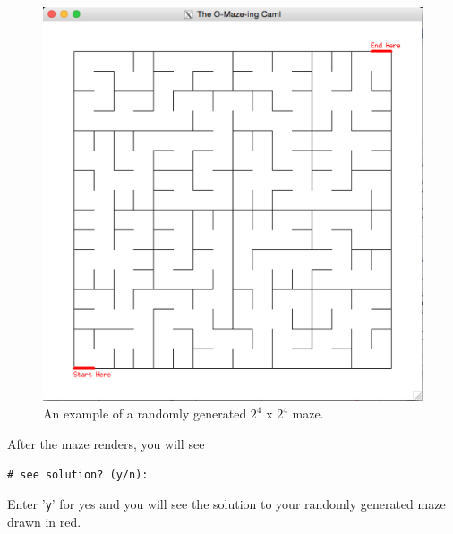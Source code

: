 \documentclass[11pt, margin=1in]{article}
\begin{document}
\begin{figure}[H]
\begin{center}
\includegraphics[scale=0.32]{example.jpg}
\caption{An example of a randomly generated $2^4$ x $2^4$ maze.}
\end{center}
\end{figure}

After the maze renders, you will see 

\begin{flushleft}
\quad \quad \texttt{\# see solution? (y/n):}
\end{flushleft}

 
Enter '\texttt{y}' for yes and you will see the solution to your randomly generated maze drawn in red.
\end{document}

